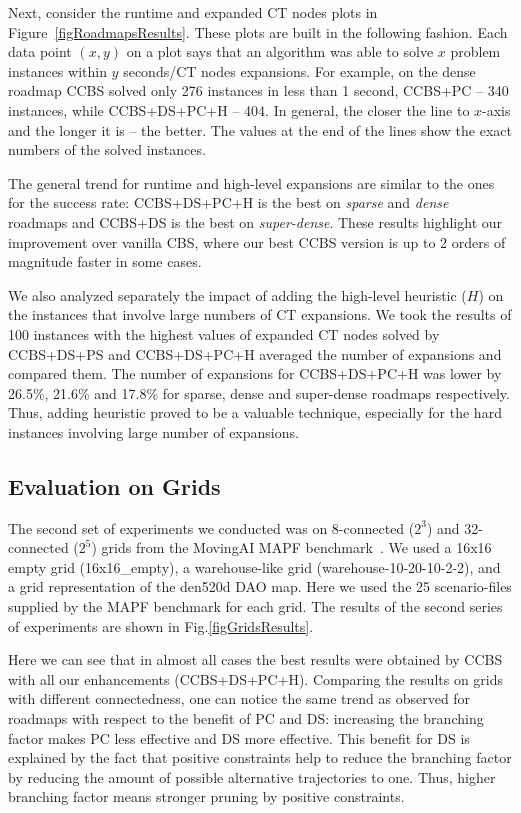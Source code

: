 \documentclass[letterpaper]{article} %
\newcommand{\cbs}{\ac{CBS}\xspace}
\newcommand{\ccbs}{\ac{CCBS}\xspace}
\newcommand{\ct}{\ac{CT}\xspace}
\newcommand{\mapf}{\ac{MAPF}\xspace}
\newcommand{\pc}{\ac{PC}\xspace}
\newcommand{\ds}{\ac{DS}\xspace}
\begin{document}
Next, consider the runtime and expanded \ct nodes plots in Figure~\ref{figRoadmapsResults}. 
These plots are built in the following fashion. 
Each data point $(x,y)$ on a plot says that an algorithm was able to solve $x$ problem instances within $y$ seconds/\ct nodes expansions. 
For example, on the dense roadmap \ccbs solved only 276 instances in less than 1 second, \ccbs+PC -- 340 instances, while \ccbs+\ds+\pc+H -- 404. In general, the closer the line to $x$-axis and the longer it is -- the better. The values at the end of the lines show the exact numbers of the solved instances. 

The general trend for runtime and high-level expansions are similar to the ones for the success rate: 
\ccbs+\ds+\pc+H is the best on \emph{sparse} and \emph{dense} roadmaps and \ccbs+\ds is the best on \emph{super-dense}. These results highlight our improvement over vanilla \cbs, where our best \ccbs version is up to 2 orders of magnitude faster in some cases. 


We also analyzed separately the impact of adding the high-level heuristic ($H$) on the instances that involve large numbers of \ct expansions. We took the results of 100 instances with the highest values of expanded \ct nodes solved by \ccbs+DS+PS and \ccbs+DS+PC+H averaged the number of expansions and compared them. The number of expansions for \ccbs+DS+PC+H was lower by 26.5\%, 21.6\% and 17.8\% for sparse, dense and super-dense roadmaps respectively. Thus, adding heuristic proved to be a valuable technique, especially for the hard instances involving large number of expansions.

\subsection{Evaluation on Grids}


The second set of experiments we conducted was on 8-connected ($2^3$) and 32-connected ($2^5$) grids from the MovingAI \mapf benchmark~\cite{stern2019multi}. We used a 16x16 empty grid (16x16\_empty), a warehouse-like grid (warehouse-10-20-10-2-2), and a grid representation of the den520d DAO map. 
Here we used the 25 scenario-files supplied by the \mapf benchmark for each grid. 
The results of the second series of experiments are shown in Fig.\ref{figGridsResults}.


Here we can see that in almost all cases  
the best results were obtained by \ccbs with all our enhancements (\ccbs+\ds+\pc+H). 
Comparing the results on grids with different connectedness, one can notice the same trend as observed for roadmaps with respect to the benefit of \pc and \ds: increasing the branching factor makes \pc less effective and \ds more effective.
This benefit for \ds is explained by the fact that positive constraints help to reduce the branching factor by reducing the amount of possible alternative trajectories to one. Thus, higher branching factor means stronger pruning by positive constraints. 
\end{document}
